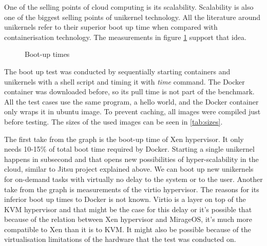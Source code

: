 One of the selling points of cloud computing is its scalability. Scalability is also one of the biggest selling points of unikernel technology. All the literature around unikernels refer to their superior boot up time when compared with containerisation technology. The measurements in figure \ref{fig:boot-up} support that idea.
\begin{figure}[htpb]
  \centering
    \caption{Boot-up times}\label{fig:boot-up}
  \end{figure}

The boot up test was conducted by sequentially starting containers and unikernels with a shell script and timing it with \textit{time} command. The Docker container was downloaded before, so its pull time is not part of the benchmark. All the test cases use the same program, a hello world, and the Docker container only wraps it in ubuntu image. To prevent caching, all images were compiled just before testing. The sizes of the used images can be seen in \ref{tab:sizes}.

The first take from the graph is the boot-up time of Xen hypervisor. It only needs 10-15\% of total boot time required by Docker. Starting a single unikernel happens in subsecond and that opens new possibilities of hyper-scalability in the cloud, similar to Jitsu project explained above. We can boot up new unikernels for on-demand tasks with virtually no delay to the system or to the user. Another take from the graph is measurements of the virtio \cite{virtio} hypervisor. The reasons for its inferior boot up times to Docker is not known. Virtio is a layer on top of the KVM hypervisor and that might be the case for this delay or it's possible that because of the relation between Xen hypervisor and MirageOS, it's much more compatible to Xen than it is to KVM. It might also be possible because of the virtualisation limitations of the hardware that the test was conducted on.

